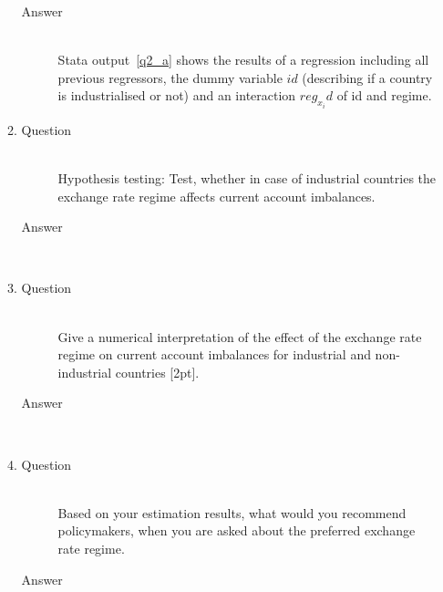 \documentclass{article}
\begin{document}
\begin{enumerate}
\begin{enumerate}[label=(\alph*)]
\begin{description}
      \item[Answer] \hfill \\
      Stata output~\ref{q2_a} shows the results of a regression including all previous regressors, the dummy variable \(id\) (describing if a country is industrialised or not) and an interaction \(reg_x_id\) of id and regime.
      \begin{figure}
      
      \end{figure}
    \end{description}
    \item 
    \begin{description}
      \item[Question] \hfill \\
      Hypothesis testing: Test, whether in case of industrial countries the exchange rate regime affects current account imbalances.
      \item[Answer] \hfill \\
    \end{description}
    \item 
    \begin{description}
      \item[Question] \hfill \\
      Give a numerical interpretation of the effect of the exchange rate regime on current account imbalances for industrial and non-industrial countries [2pt].
      \item[Answer] \hfill \\
    \end{description}
    \item 
    \begin{description}
      \item[Question] \hfill \\
      Based on your estimation results, what would you recommend policymakers, when you are asked about the preferred exchange rate regime.
      \item[Answer] \hfill \\
    \end{description}
  \end{enumerate}
\end{enumerate}
    
\end{document}
